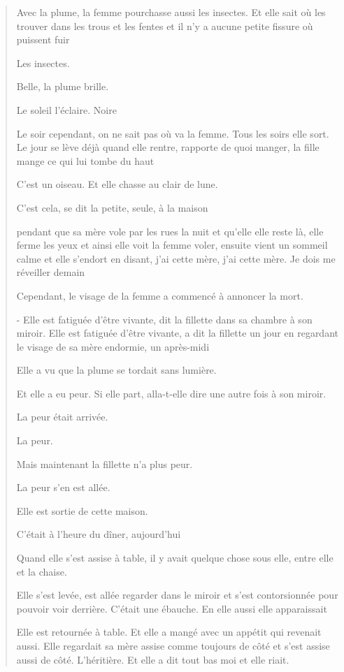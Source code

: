 \begin{quote}
Avec la plume, la femme pourchasse aussi les insectes. Et elle sait où
les trouver dans les trous et les fentes et il n'y a aucune petite
fissure où puissent fuir

Les insectes.

Belle, la plume brille.

Le soleil l'éclaire. Noire

Le soir cependant, on ne sait pas où va la femme. Tous les soirs elle
sort. Le jour se lève déjà quand elle rentre, rapporte de quoi manger,
la fille mange ce qui lui tombe du haut

C'est un oiseau. Et elle chasse au clair de lune.

C'est cela, se dit la petite, seule, à la maison

pendant que sa mère vole par les rues la nuit et qu'elle elle reste là,
elle ferme les yeux et ainsi elle voit la femme voler, ensuite vient un
sommeil calme et elle s'endort en disant, j'ai cette mère, j'ai cette
mère. Je dois me réveiller demain

Cependant, le visage de la femme a commencé à annoncer la mort.

- Elle est fatiguée d'être vivante, dit la fillette dans sa chambre à
son miroir. Elle est fatiguée d'être vivante, a dit la fillette un jour
en regardant le visage de sa mère endormie, un après-midi

Elle a vu que la plume se tordait sans lumière.

Et elle a eu peur. Si elle part, alla-t-elle dire une autre fois à son
miroir.

La peur était arrivée.

La peur.

Mais maintenant la fillette n'a plus peur.

La peur s'en est allée.

Elle est sortie de cette maison.

C'était à l'heure du dîner, aujourd'hui

Quand elle s'est assise à table, il y avait quelque chose sous elle,
entre elle et la chaise.

Elle s'est levée, est allée regarder dans le miroir et s'est
contorsionnée pour pouvoir voir derrière. C'était une ébauche. En elle
aussi elle apparaissait

Elle est retournée à table. Et elle a mangé avec un appétit qui revenait
aussi. Elle regardait sa mère assise comme toujours de côté et s'est
assise aussi de côté. L'héritière. Et elle a dit tout bas moi et elle
riait.


\end{quote}
